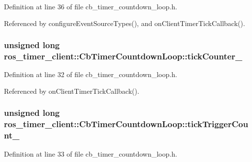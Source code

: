 Definition at line 36 of file cb\+\_\+timer\+\_\+countdown\+\_\+loop.\+h.



Referenced by configure\+Event\+Source\+Types(), and on\+Client\+Timer\+Tick\+Callback().

\subsubsection[{\texorpdfstring{tick\+Counter\+\_\+}{tickCounter_}}]{\setlength{\rightskip}{0pt plus 5cm}unsigned long ros\+\_\+timer\+\_\+client\+::\+Cb\+Timer\+Countdown\+Loop\+::tick\+Counter\+\_\+\hspace{0.3cm}{\ttfamily [private]}}\hypertarget{classros__timer__client_1_1CbTimerCountdownLoop_a7f9185e95af1d5be03be20b466122239}{}\label{classros__timer__client_1_1CbTimerCountdownLoop_a7f9185e95af1d5be03be20b466122239}


Definition at line 32 of file cb\+\_\+timer\+\_\+countdown\+\_\+loop.\+h.



Referenced by on\+Client\+Timer\+Tick\+Callback().

\subsubsection[{\texorpdfstring{tick\+Trigger\+Count\+\_\+}{tickTriggerCount_}}]{\setlength{\rightskip}{0pt plus 5cm}unsigned long ros\+\_\+timer\+\_\+client\+::\+Cb\+Timer\+Countdown\+Loop\+::tick\+Trigger\+Count\+\_\+\hspace{0.3cm}{\ttfamily [private]}}\hypertarget{classros__timer__client_1_1CbTimerCountdownLoop_a864df8e309c3cbbb1fd225faf6d2cadf}{}\label{classros__timer__client_1_1CbTimerCountdownLoop_a864df8e309c3cbbb1fd225faf6d2cadf}


Definition at line 33 of file cb\+\_\+timer\+\_\+countdown\+\_\+loop.\+h.



